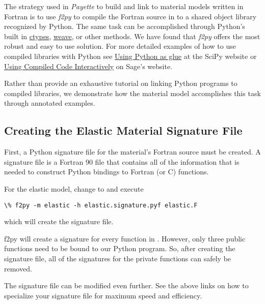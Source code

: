 \documentclass[letterpaper,10pt,english]{sphinxmanual}
\begin{document}
The strategy used in \emph{Payette} to build and link to material models written in
Fortran is to use \emph{f2py} to compile the Fortran source in to a shared object
library recognized by Python. The same task can be accomplished through Python's
built in \href{http://docs.python.org/library/ctypes.html}{ctypes}, \href{http://www.scipy.org/Weave}{weave}, or other methods. We have found that \emph{f2py}
offers the most robust and easy to use solution. For more detailed examples of
how to use compiled libraries with Python see \href{http://docs.scipy.org/doc/numpy/user/c-info.python-as-glue.html}{Using Python as glue} at the SciPy
website or \href{http://www.sagemath.org/doc/numerical\_sage/using\_compiled\_code\_iteractively.html}{Using Compiled Code Interactively}
on Sage's website.

Rather than provide an exhaustive tutorial on linking Python programs to compiled
libraries, we demonstrate how the  material model accomplishes this
task through annotated examples.


\subsection{Creating the Elastic Material Signature File}
\label{Files/installing_materials:creating-the-elastic-material-signature-file}
First, a Python signature file for the  material's Fortran source must
be created. A signature file is a Fortran 90 file that contains all of the
information that is needed to construct Python bindings to Fortran (or C)
functions.

For the elastic model, change to
 and execute

\begin{Verbatim}[commandchars=\\\{\}]
\% f2py -m elastic -h elastic.signature.pyf elastic.F
\end{Verbatim}

which will create the  signature file.

f2py will create a signature for every function in . However,
only three public functions need to be bound to our Python program. So, after
creating the signature file, all of the signatures for the private functions can
safely be removed.

The signature file can be modified even further. See the above links on how to
specialize your signature file for maximum speed and efficiency.
\end{document}
